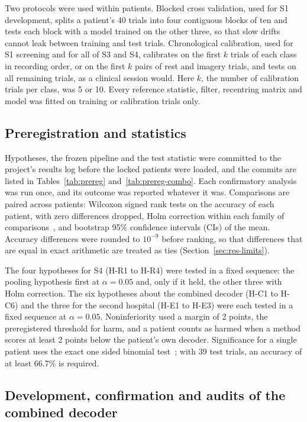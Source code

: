 \documentclass[pdflatex,sn-mathphys-num]{sn-jnl}
\begin{document}
Two protocols were used within patients. Blocked cross validation, used for S1 development, splits a patient's 40 trials into four contiguous blocks of ten and tests each block with a model trained on the other three, so that slow drifts cannot leak between training and test trials. Chronological calibration, used for S1 screening and for all of S3 and S4, calibrates on the first $k$ trials of each class in recording order, or on the first $k$ pairs of rest and imagery trials, and tests on all remaining trials, as a clinical session would. Here $k$, the number of calibration trials per class, was 5 or 10. Every reference statistic, filter, recentring matrix and model was fitted on training or calibration trials only.

\subsection{Preregistration and statistics}\label{sec:stats}

Hypotheses, the frozen pipeline and the test statistic were committed to the project's results log before the locked patients were loaded, and the commits are listed in Tables~\ref{tab:prereg} and~\ref{tab:prereg-combo}. Each confirmatory analysis was run once, and its outcome was reported whatever it was. Comparisons are paired across patients: Wilcoxon signed rank tests on the accuracy of each patient, with zero differences dropped, Holm correction within each family of comparisons~\cite{holm1979}, and bootstrap 95\% confidence intervals (CIs) of the mean. Accuracy differences were rounded to $10^{-9}$ before ranking, so that differences that are equal in exact arithmetic are treated as ties (Section~\ref{sec:res-limits}).

The four hypotheses for S4 (H-R1 to H-R4) were tested in a fixed sequence: the pooling hypothesis first at $\alpha = 0.05$ and, only if it held, the other three with Holm correction. The six hypotheses about the combined decoder (H-C1 to H-C6) and the three for the second hospital (H-E1 to H-E3) were each tested in a fixed sequence at $\alpha = 0.05$. Noninferiority used a margin of 2 points, the preregistered threshold for harm, and a patient counts as harmed when a method scores at least 2 points below the patient's own decoder. Significance for a single patient uses the exact one sided binomial test~\cite{combrisson2015}; with 39 test trials, an accuracy of at least 66.7\% is required.

\subsection{Development, confirmation and audits of the combined decoder}\label{sec:combo-setup}
\end{document}
